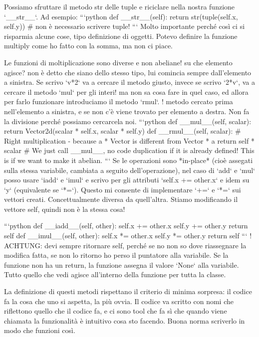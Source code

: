 \documentclass[10pt, a4paper, twosided, titlepage, draft]{book}
\begin{document}
Possiamo sfruttare il metodo str delle tuple e riciclare nella nostra funzione `__str__`.
Ad esempio:
```python
def __str__(self):
return str(tuple(self.x, self.y)) # non è necessario scrivere tuple!
```
Molto importante perché così ci si risparmia alcune cose, tipo definizione di oggetti. Potevo definire la funzione multiply come ho fatto con la somma, ma non ci piace.

Le funzioni di moltiplicazione sono diverse e non abeliane! su che elemento agisce? non è detto che siano dello stesso tipo, lui comincia sempre dall'elemento a sinistra.
Se scrivo `v*2` va a cercare il metodo giusto, invece se scrivo `2*v`, va a cercare il metodo `mul` per gli interi! ma non sa cosa fare in quel caso, ed allora per farlo funzionare introduciamo il metodo `rmul`. ! metodo cercato prima nell'elemento a sinistra, e se non c'è viene trovato per elemento a destra. Non fa la divisione perché possiamo cercarcela noi.
```python
def __mul__(self, scalar):
return Vector2d(scalar * self.x, scalar * self.y)
def __rmul__(self, scalar):
# Right multiplication - because a * Vector is different from Vector * a
return self * scalar # We just call __mul__, no code duplication if it is already defined! This is if we want to make it abelian.
```
Se le operazioni sono *in-place* (cioè assegati sulla stessa variabile, cambiata a seguito dell'operazione), nel caso di `add` e `mul` posso usare `iadd` e `imul` e scrivo per gli attributi `self.x += other.x` e idem su `y` (equivalente se `*=`). Questo mi consente di implementare `+=` e `*=` sui vettori creati.
Concettualmente diversa da quell'altra. Stiamo modificando il vettore self, quindi non è la stessa cosa!

```python
def __iadd__(self, other):
self.x += other.x
self.y += other.y
return self
def __imul__(self, other):
self.x *= other.x
self.y *= other.y
return self
```
! ACHTUNG: devi sempre ritornare self, perché se no non so dove riassegnare la modifica fatta, se non lo ritorno ho perso il puntatore alla variabile. Se la funzione non ha un return, la funzione assegna il valore `None` alla variabile. Tutto quello che vedi agisce all'interno della funzione per tutta la classe.

La definizione di questi metodi rispettano il criterio di minima sorpresa: il codice fa la cosa che uno si aspetta, la più ovvia.
Il codice va scritto con nomi che riflettono quello che il codice fa, e ci sono tool che fa sì che quando viene chiamata la funzionalità è intuitivo cosa sto facendo. Buona norma scriverlo in modo che funzioni così.
\end{document}
